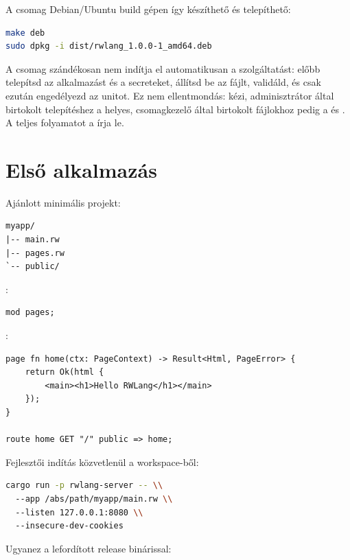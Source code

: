 A csomag Debian/Ubuntu build gépen így készíthető és telepíthető:

\begin{lstlisting}[language=bash]
make deb
sudo dpkg -i dist/rwlang_1.0.0-1_amd64.deb
\end{lstlisting}

A csomag szándékosan nem indítja el automatikusan a szolgáltatást: előbb telepítsd az alkalmazást és a secreteket, állítsd be az  fájlt, validáld, és csak ezután engedélyezd az  unitot. Ez nem ellentmondás: kézi, adminisztrátor által birtokolt telepítéshez a  helyes, csomagkezelő által birtokolt fájlokhoz pedig a  és . A teljes folyamatot a  írja le.

\section{Első alkalmazás}

Ajánlott minimális projekt:

\begin{lstlisting}
myapp/
|-- main.rw
|-- pages.rw
`-- public/
\end{lstlisting}

:

\begin{lstlisting}[language=RWLang]
mod pages;
\end{lstlisting}

:

\begin{lstlisting}[language=RWLang]
page fn home(ctx: PageContext) -> Result<Html, PageError> {
    return Ok(html {
        <main><h1>Hello RWLang</h1></main>
    });
}

route home GET "/" public => home;
\end{lstlisting}

Fejlesztői indítás közvetlenül a workspace-ből:

\begin{lstlisting}[language=bash]
cargo run -p rwlang-server -- \\
  --app /abs/path/myapp/main.rw \\
  --listen 127.0.0.1:8080 \\
  --insecure-dev-cookies
\end{lstlisting}

Ugyanez a lefordított release binárissal:

